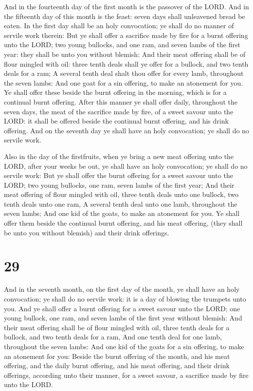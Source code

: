  And in the fourteenth day of the first month is the
passover of the LORD.  And in the fifteenth day of this
month is the feast: seven days shall unleavened bread be eaten.
 In the first day shall be an holy convocation; ye shall do
no manner of servile work therein:  But ye shall offer a
sacrifice made by fire for a burnt offering unto the LORD; two young
bullocks, and one ram, and seven lambs of the first year: they shall be
unto you without blemish:  And their meat offering shall be
of flour mingled with oil: three tenth deals shall ye offer for a
bullock, and two tenth deals for a ram;  A several tenth
deal shalt thou offer for every lamb, throughout the seven lambs:
 And one goat for a sin offering, to make an atonement for
you.  Ye shall offer these beside the burnt offering in the
morning, which is for a continual burnt offering.  After
this manner ye shall offer daily, throughout the seven days, the meat of
the sacrifice made by fire, of a sweet savour unto the LORD: it shall be
offered beside the continual burnt offering, and his drink offering.
 And on the seventh day ye shall have an holy convocation;
ye shall do no servile work.

 Also in the day of the firstfruits, when ye bring a new
meat offering unto the LORD, after your weeks be out, ye shall have an
holy convocation; ye shall do no servile work:  But ye
shall offer the burnt offering for a sweet savour unto the LORD; two
young bullocks, one ram, seven lambs of the first year; 
And their meat offering of flour mingled with oil, three tenth deals
unto one bullock, two tenth deals unto one ram,  A several
tenth deal unto one lamb, throughout the seven lambs;  And
one kid of the goats, to make an atonement for you.  Ye
shall offer them beside the continual burnt offering, and his meat
offering, (they shall be unto you without blemish) and their drink
offerings.

\hypertarget{section-28}{%
\section{29}\label{section-28}}

 And in the seventh month, on the first day of the month, ye
shall have an holy convocation; ye shall do no servile work: it is a day
of blowing the trumpets unto you.  And ye shall offer a
burnt offering for a sweet savour unto the LORD; one young bullock, one
ram, and seven lambs of the first year without blemish:  And
their meat offering shall be of flour mingled with oil, three tenth
deals for a bullock, and two tenth deals for a ram,  And one
tenth deal for one lamb, throughout the seven lambs:  And
one kid of the goats for a sin offering, to make an atonement for you:
 Beside the burnt offering of the month, and his meat
offering, and the daily burnt offering, and his meat offering, and their
drink offerings, according unto their manner, for a sweet savour, a
sacrifice made by fire unto the LORD.


